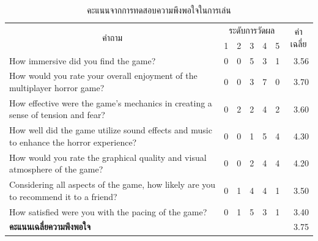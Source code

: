 \begin{table}[]
    \begin{tabular}{|p{}|lllllr|}
    \hline
    \multicolumn{1}{|c|}{\multirow{2}{*}{คำถาม}} &
      \multicolumn{5}{c|}{ระดับการวัดผล} &
      \multicolumn{1}{c|}{\multirow{2}{*}{ค่าเฉลี่ย}} \\ \cline{2-6}
    \multicolumn{1}{|c|}{} &
      \multicolumn{1}{c|}{1} &
      \multicolumn{1}{c|}{2} &
      \multicolumn{1}{c|}{3} &
      \multicolumn{1}{c|}{4} &
      \multicolumn{1}{c|}{5} &
      \multicolumn{1}{c|}{} \\ \hline
    How immersive did you find the game? &
      \multicolumn{1}{c|}{0} &
      \multicolumn{1}{c|}{0} &
      \multicolumn{1}{c|}{5} &
      \multicolumn{1}{c|}{3} &
      \multicolumn{1}{l|}{1} &
      3.56 \\ \hline
    How would you rate your overall enjoyment of the multiplayer horror game? &
      \multicolumn{1}{l|}{0} &
      \multicolumn{1}{l|}{0} &
      \multicolumn{1}{l|}{3} &
      \multicolumn{1}{l|}{7} &
      \multicolumn{1}{l|}{0} &
      3.70 \\ \hline
    How effective were the game's mechanics in creating a sense of tension and fear? &
      \multicolumn{1}{l|}{0} &
      \multicolumn{1}{l|}{2} &
      \multicolumn{1}{l|}{2} &
      \multicolumn{1}{l|}{4} &
      \multicolumn{1}{l|}{2} &
      3.60 \\ \hline
    How well did the game utilize sound effects and music to enhance the horror experience? &
      \multicolumn{1}{l|}{0} &
      \multicolumn{1}{l|}{0} &
      \multicolumn{1}{l|}{1} &
      \multicolumn{1}{l|}{5} &
      \multicolumn{1}{l|}{4} &
      4.30 \\ \hline
    How would you rate the graphical quality and visual atmosphere of the game? &
      \multicolumn{1}{l|}{0} &
      \multicolumn{1}{l|}{0} &
      \multicolumn{1}{l|}{2} &
      \multicolumn{1}{l|}{4} &
      \multicolumn{1}{l|}{4} &
      4.20 \\ \hline
    Considering all aspects of the game, how likely are you to recommend it to a friend? &
      \multicolumn{1}{l|}{0} &
      \multicolumn{1}{l|}{1} &
      \multicolumn{1}{l|}{4} &
      \multicolumn{1}{l|}{4} &
      \multicolumn{1}{l|}{1} &
      3.50 \\ \hline
    How satisfied were you with the pacing of the game? &
      \multicolumn{1}{l|}{0} &
      \multicolumn{1}{l|}{1} &
      \multicolumn{1}{l|}{5} &
      \multicolumn{1}{l|}{3} &
      \multicolumn{1}{l|}{1} &
      3.40 \\ \hline
    \textbf{คะแนนเฉลี่ยความพึงพอใจ} &
      \multicolumn{6}{r|}{3.75} \\ \hline
    \end{tabular}
    \caption{คะแนนจากการทดสอบความพึงพอใจในการเล่น}
\end{table}

